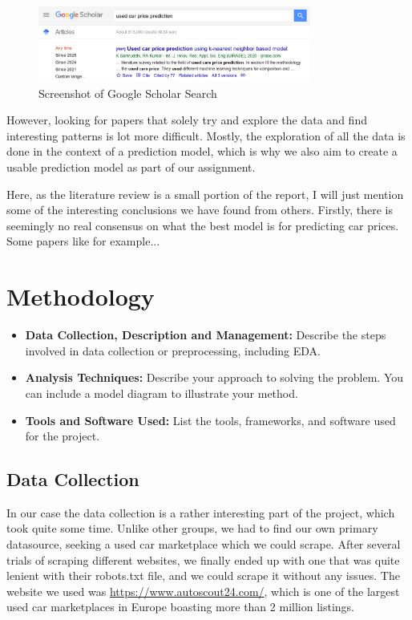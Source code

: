 \documentclass[12pt]{article}
\begin{document}
\begin{figure}[ht]
  \centering
  \includegraphics[width=0.8\textwidth]{./images/google_scholar.png}
  \caption{Screenshot of Google Scholar Search}
  \label{fig:google_scholar}
\end{figure}

However, looking for papers that solely try and explore the data and find interesting patterns is lot more difficult. Mostly, the exploration of all the data is done in the context of a prediction model, which is why we also aim to create a usable prediction model as part of our assignment.

Here, as the literature review is a small portion of the report, I will just mention some of the interesting conclusions we have found from others. Firstly, there is seemingly no real consensus on what the best model is for predicting car prices.
Some papers like \cite{alsharedUsedCarsPrice2021} for example...

\section{Methodology}
\begin{itemize}
    \item \textbf{Data Collection, Description and Management:} Describe the steps involved in data collection or preprocessing, including EDA.
    \item \textbf{Analysis Techniques:} Describe your approach to solving the problem. You can include a model diagram to illustrate your method.
    \item \textbf{Tools and Software Used:} List the tools, frameworks, and software used for the project.
\end{itemize}

\subsection{Data Collection}
In our case the data collection is a rather interesting part of the project, which took quite some time. Unlike other groups, we had to find our own primary datasource, seeking a used car marketplace which we could scrape.
After several trials of scraping different websites, we finally ended up with one that was quite lenient with their robots.txt file, and we could scrape it without any issues. The website we used was \url{https://www.autoscout24.com/}, which is one of the largest used car marketplaces in Europe boasting more than 2 million listings.
\end{document}
